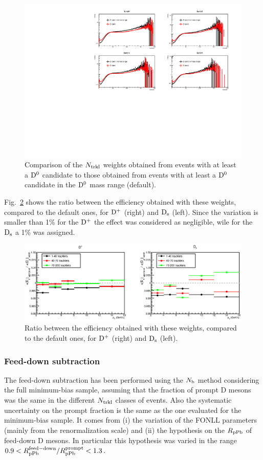 \begin{figure}[htpb]
\centering
 \includegraphics[width=.9\textwidth]{FigCap6/NtrkWeightsD-Cand_4Bunches_DsDplusVsmult.pdf}
 \caption{Comparison of the $N_{\rm trkl}$ weights obtained from events with at least a ${\rm D^0}$ candidate to those obtained from events with at least a ${\rm D^0}$ candidate in the ${\rm D^0}$ mass range (default).}
 \label{fig:NtrklWeights_EvWithD_EvWithCand_Comparison}
\end{figure}

Fig.~\ref{fig:DsDplusVsMult_SystEffWeights} shows the ratio between the efficiency obtained with these weights, compared to the default ones, for ${\rm D^+}$ (right) and ${\rm D_s}$ (left). Since the variation is smaller than 1\% for the ${\rm D^+}$ the effect was considered as negligible, wile for the ${\rm D_s}$ a 1\% was assigned.

\begin{figure}[htpb]
\centering
 \includegraphics[width=.9\textwidth]{FigCap6/SystOnDWeightsWithCandVsWithD.eps}
 \caption{Ratio between the efficiency obtained with these weights, compared to the default ones, for ${\rm D^+}$ (right) and ${\rm D_s}$ (left).}
 \label{fig:DsDplusVsMult_SystEffWeights}
\end{figure}

\subsubsection{Feed-down subtraction}
The feed-down subtraction has been performed using the $N_{\rm b}$ method considering the full minimum-bias sample, assuming that the fraction of prompt D mesons was the same in the different $N_{\rm trkl}$ classes of events. Also the systematic uncertainty on the prompt fraction is the same as the one evaluated for the minimum-bias sample. It comes from (i) the variation of the FONLL parameters (mainly from the renormalization scale) and (ii) the hypothesis on the $R_{\rm pPb}$ of feed-down D mesons. In particular this hypothesis was varied in the range $0.9 <R_{\rm pPb}^{\rm feed-down}/R_{\rm pPb}^{\rm prompt} < 1.3$.

